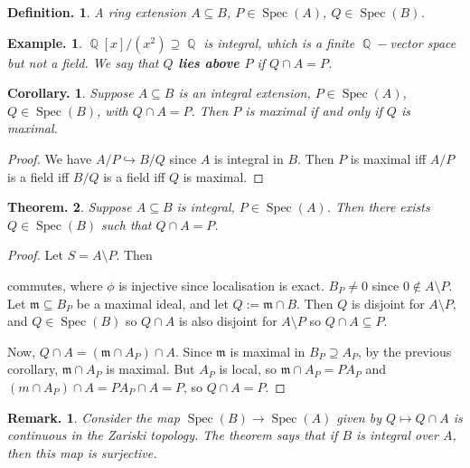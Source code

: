 \documentclass[11pt, a4paper]{memoir}
\DeclareMathOperator{\Q}{{\mathbb{Q}}}
\theoremstyle{change}
\newtheorem{theorem}{Theorem.}[section]
\newtheorem{corollary}[theorem]{Corollary.}
\theoremstyle{plain}
\theoremstyle{nonumberplain}
\newtheorem{definition}{Definition.}
\newtheorem{example}{Example.}
\newtheorem{remark}{Remark.}
\newtheorem{proof}{Proof}
\DeclareMathOperator{\Spec}{Spec}
\numberwithin{equation}{section}
\begin{document}
\begin{definition}
    A ring extension $A\subseteq B$, $P\in\Spec(A)$, $Q\in\Spec(B)$.
\end{definition}
\begin{example}
    $\Q[x]/(x^2)\supseteq\Q$ is integral, which is a finite $\Q-$vector space but not a field.
    We say that \textbf{$Q$ lies above $P$} if $Q\cap A=P$.
\end{example}
\begin{corollary}
    Suppose $A\subseteq B$ is an integral extension, $P\in\Spec(A)$, $Q\in\Spec(B)$, with $Q\cap A=P$.
    Then $P$ is maximal if and only if $Q$ is maximal.
\end{corollary}
\begin{proof}
    We have $A/P\hookrightarrow B/Q$ since $A$ is integral in $B$.
    Then $P$ is maximal iff $A/P$ is a field iff $B/Q$ is a field iff $Q$ is maximal.
\end{proof}
\begin{theorem}
    Suppose $A\subseteq B$ is integral, $P\in\Spec(A)$.
    Then there exists $Q\in\Spec(B)$ such that $Q\cap A=P$.
\end{theorem}
\begin{proof}
    Let $S=A\setminus P$.
    Then
    \begin{center}
    \end{center}
    commutes, where $\phi$ is injective since localisation is exact.
    $B_P\neq 0$ since $0\notin A\setminus P$.
    Let $\mathfrak{m}\subseteq B_P$ be a maximal ideal, and let $Q:=\mathfrak{m}\cap B$.
    Then $Q$ is disjoint for $A\setminus P$, and $Q\in\Spec(B)$ so $Q\cap A$ is also disjoint for $A\setminus P$ so $Q\cap A\subseteq P$.

    Now, $Q\cap A=(\mathfrak{m}\cap A_P)\cap A$.
    Since $\mathfrak{m}$ is maximal in $B_P\supseteq A_P$, by the previous corollary, $\mathfrak{m}\cap A_P$ is maximal.
    But $A_P$ is local, so $\mathfrak{m}\cap A_P=PA_P$ and $(m\cap A_P)\cap A=PA_P\cap A=P$, so $Q\cap A=P$.
\end{proof}
\begin{remark}
    Consider the map $\Spec(B)\to\Spec(A)$ given by $Q\mapsto Q\cap A$ is continuous in the Zariski topology.
    The theorem says that if $B$ is integral over $A$, then this map is surjective.
\end{remark}
\end{document}
